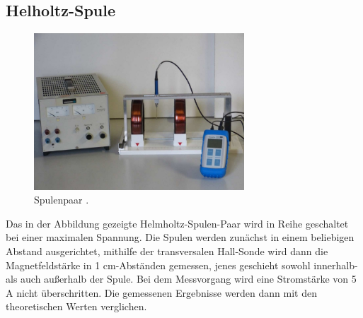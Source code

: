 \subsection{Helholtz-Spule}
\begin{figure}
    \caption{Spulenpaar \cite{anleitung1}.}
    \centering
    \includegraphics[width=0.7\textwidth]{"Bilder/helmholtz.jpg"}
\end{figure}
\noindent Das in der Abbildung gezeigte Helmholtz-Spulen-Paar wird in Reihe 
geschaltet bei einer maximalen Spannung. Die Spulen werden zunächst in einem
beliebigen Abstand ausgerichtet, mithilfe der transversalen Hall-Sonde wird
dann die Magnetfeldstärke in 1 cm-Abständen gemessen, jenes geschieht sowohl
innerhalb-als auch außerhalb der Spule. Bei dem Messvorgang wird eine Stromstärke 
von 5 A nicht überschritten. Die gemessenen Ergebnisse werden dann
mit den theoretischen Werten verglichen.